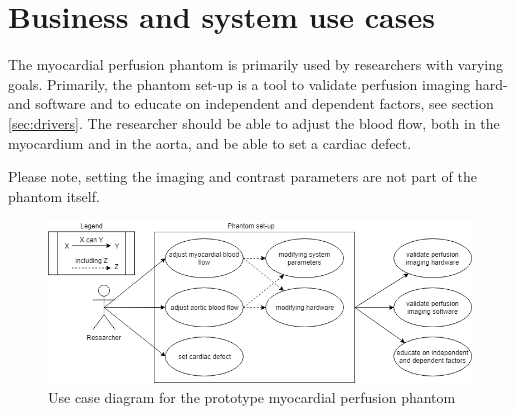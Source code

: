 \section{Business and system use cases}	
The myocardial perfusion phantom is primarily used by researchers with varying goals. Primarily, the phantom set-up is a tool to validate perfusion imaging hard- and software and to educate on independent and dependent factors, see section \ref{sec:drivers}. The researcher should be able to adjust the blood flow, both in the myocardium and in the aorta, and be able to set a cardiac defect.

Please note, setting the imaging and contrast parameters are not part of the phantom itself. 
\begin{figure}
	\includegraphics[width=\textwidth]{./images/usecase_diagram.png}
	\caption{Use case diagram for the prototype myocardial perfusion phantom}
	\label{fig:usecase}
\end{figure}

